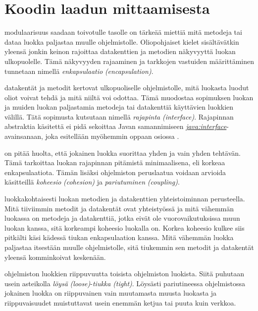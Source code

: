 \documentclass{tufte-book}
\newcommand{\eng}[1]{\textit{(#1)}}
\newcommand{\new}[1]{\textit{\gls{#1}}}
\newcommand{\newnogls}[1]{\textit{#1}}
\newcommand{\neweng}[2]{\new{#1} \eng{#2}}
\newcommand{\newengnogls}[2]{\newnogls{#1} \eng{#2}}
\newcommand{\java}[1]{\underline{\gls{java:#1}}}
\newcommand{\newjava}[1]{\textit{\java{#1}}}
\begin{document}

\section{Koodin laadun mittaamisesta}
\label{koodin laadusta}

 modulaarisuus saadaan toivotulle tasolle on tärkeää miettiä mitä
metodeja tai dataa luokka paljastaa muulle ohjelmistolle. Oliopohjaiset kielet sisältävätkin
yleensä jonkin keinon rajoittaa datakenttien ja metodien näkyvyyttä luokan ulkopuolelle. Tämä
näkyvyyden rajaaminen ja tarkkojen vastuiden määrittäminen tunnetaan nimellä
\neweng{enkapsulaatio}{encapsulation}.

 datakentät ja metodit kertovat ulkopuoliselle ohjelmistolle, mitä
luokasta luodut oliot voivat tehdä ja mitä niiltä voi odottaa. Tämä muodostaa sopimuksen luokan ja
muiden luokan paljastamia metodeja tai datakenttiä käyttävien luokkien välillä. Tätä sopimusta
kutsutaan nimellä \neweng{rajapinta}{interface}. Rajapinnan abstraktia käsitettä ei pidä sekoittaa
Javan samannimiseen \newjava{interface}-avainsanaan, joka esitellään myöhemmin oppaan osiossa
.

 on pitää huolta, että jokainen luokka
suorittaa yhden ja vain yhden tehtävän. Tämä tarkoittaa luokan rajapinnan pitämistä minimaalisena,
eli korkeaa enkapsulaatiota. Tämän lisäksi ohjelmiston peruslaatua voidaan arvioida käsitteillä
\neweng{koheesio}{cohesion} ja \neweng{pariutuminen}{coupling}.

 luokkakohtaisesti luokan metodien ja datakenttien
yhteistoiminnan perusteella. Mitä tiiviimmin metodit ja datakentät ovat yhteistyössä ja mitä
vähemmän luokassa on metodeja ja datakenttiä, jotka eivät ole vuorovaikutuksissa muun luokan
kanssa, sitä korkeampi koheesio luokalla on. Korkea koheesio kulkee siis pitkälti käsi kädessä
tiukan enkapsulaation kanssa. Mitä vähemmän luokka paljastaa itsestään muulle ohjelmistolle, sitä
tiukemmin sen metodit ja datakentät yleensä komminkoivat keskenään.

 ohjelmiston luokkien riippuvuutta toisista ohjelmiston
luokista. Siitä puhutaan usein asteikolla \newengnogls{löysä}{loose}-\newengnogls{tiukka}{tight}.
Löysästi pariutineessa ohjelmistossa jokainen luokka on riippuvainen vain muutamasta muusta
luokasta ja riippuvaisuudet muistuttavat usein enemmän ketjua tai puuta kuin verkkoa.
\end{document}

